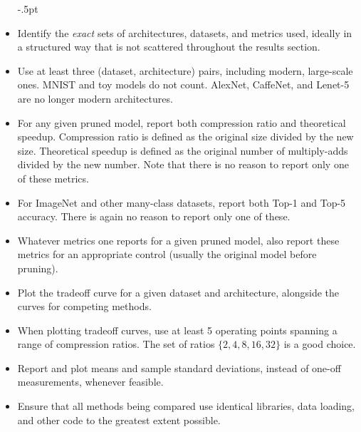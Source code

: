\begin{itemize}[leftmargin=4mm]
    \itemsep-.5pt
    \vspace{-2mm}
\item Identify the \textit{exact} sets of architectures, datasets, and metrics used, ideally in a structured way that is not scattered throughout the results section. %
\item Use at least three (dataset, architecture) pairs, including modern, large-scale ones. MNIST and toy models do not count. AlexNet, CaffeNet, and Lenet-5 are no longer modern architectures.
\item For any given pruned model, report both compression ratio and theoretical speedup. Compression ratio is defined as the original size divided by the new size. Theoretical speedup is defined as the original number of multiply-adds divided by the new number. Note that there is no reason to report only one of these metrics.%
\item For ImageNet and other many-class datasets, report both Top-1 and Top-5 accuracy. There is again no reason to report only one of these.
\item Whatever metrics one reports for a given pruned model, also report these metrics for an appropriate control (usually the original model before pruning).
\item Plot the tradeoff curve for a given dataset and architecture, alongside the curves for competing methods. %
\item When plotting tradeoff curves, use at least 5 operating points spanning a range of compression ratios. The set of ratios $\{2, 4, 8, 16, 32\}$ is a good choice.
\item Report and plot means and sample standard deviations, instead of one-off measurements, whenever feasible.
\item Ensure that all methods being compared use identical libraries, data loading, and other code to the greatest extent possible.
\vspace{-2mm}
\end{itemize}

